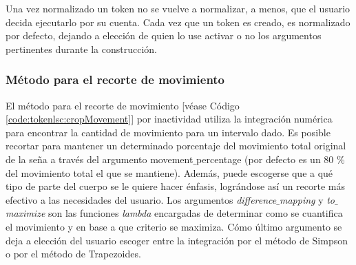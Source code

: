 Una vez normalizado un token no se vuelve a normalizar, a menos, que el usuario decida ejecutarlo por su cuenta. Cada vez que un token es creado, es normalizado por defecto, dejando a elección de quien lo use activar o no los argumentos pertinentes durante la construcción.

\subsubsection{Método para el recorte de movimiento}
El método para el recorte de movimiento [véase Código \ref{code:tokenlsc:cropMovement}] por inactividad utiliza la integración numérica para  encontrar la cantidad de movimiento para un intervalo dado. Es posible recortar para mantener un determinado porcentaje del movimiento total original de la seña a través del argumento movement$\_{}$percentage (por defecto es un 80 \% del movimiento total el que se mantiene). Además, puede escogerse que a qué tipo de parte del cuerpo se le quiere hacer énfasis, lográndose así un recorte más efectivo a las necesidades del usuario. Los argumentos \textit{difference$\_{}$mapping} y  \textit{to$\_{}$maximize} son las funciones \textit{lambda} encargadas de determinar como se cuantifica el movimiento y en base a que criterio se maximiza. Cómo último argumento se deja a elección del usuario escoger entre la integración por el método de Simpson o por el método de Trapezoides.
